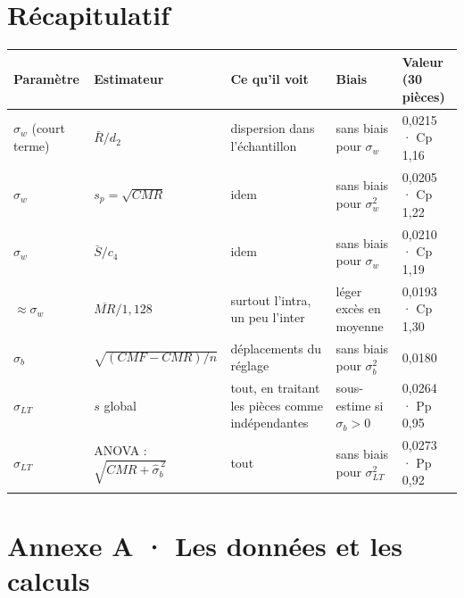 \documentclass[11pt,a4paper]{article}
\theoremstyle{tq}
\theoremstyle{remark}
\newcommand{\Rb}{\bar{R}}
\newcommand{\sw}{\sigma_w}
\newcommand{\sbt}{\sigma_b}
\begin{document}
\section{Récapitulatif}

\begin{center}\small
\renewcommand{\arraystretch}{1.25}
\begin{tabular}{@{}>{\raggedright}p{2.1cm}>{\raggedright}p{3.9cm}>{\raggedright}p{3.1cm}>{\raggedright}p{2.5cm}p{2.6cm}@{}}
\toprule
Paramètre & Estimateur & Ce qu'il voit & Biais & Valeur (30 pièces)\\
\midrule
$\sw$ (court terme) & $\Rb/d_2$ & dispersion dans l'échantillon & sans biais pour $\sw$ & 0,0215 · Cp 1,16\\
$\sw$ & $s_p=\sqrt{CMR}$ & idem & sans biais pour $\sw^2$ & 0,0205 · Cp 1,22\\
$\sw$ & $\bar S/c_4$ & idem & sans biais pour $\sw$ & 0,0210 · Cp 1,19\\
$\approx\sw$ & $\overline{MR}/1{,}128$ & surtout l'intra, un peu l'inter & léger excès en moyenne & 0,0193 · Cp 1,30\\
$\sbt$ & $\sqrt{(CMF-CMR)/n}$ & déplacements du réglage & sans biais pour $\sbt^2$ & 0,0180\\
$\sigma_{LT}$ & $s$ global & tout, en traitant les pièces comme indépendantes & sous-estime si $\sbt>0$ & 0,0264 · Pp 0,95\\
$\sigma_{LT}$ & ANOVA : $\sqrt{CMR+\hat\sigma_b^{\,2}}$ & tout & sans biais pour $\sigma_{LT}^2$ & 0,0273 · Pp 0,92\\
\bottomrule
\end{tabular}
\end{center}

\section*{Annexe A · Les données et les calculs}
\end{document}

